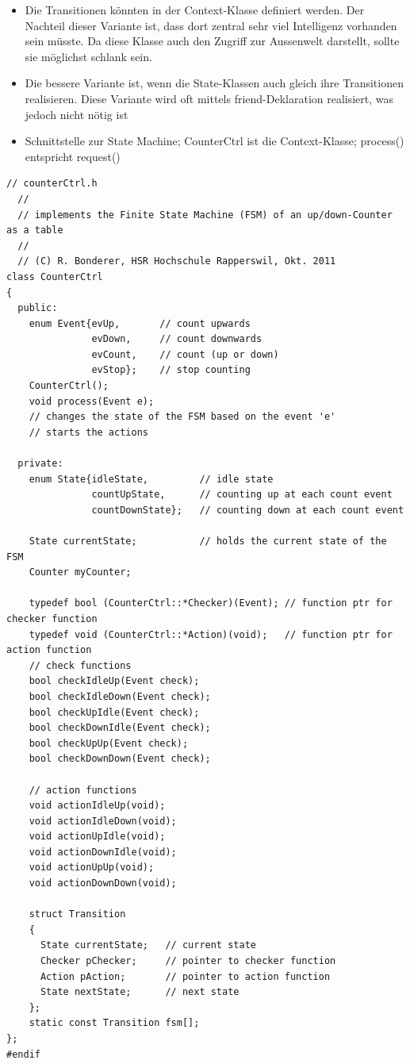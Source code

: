 \begin{itemize}
      \item Die Transitionen könnten in der Context-Klasse definiert werden. Der
            Nachteil dieser Variante ist, dass dort zentral sehr viel Intelligenz vorhanden
            sein müsste. Da diese Klasse auch den Zugriff zur Aussenwelt darstellt, sollte
            sie möglichst schlank sein.
      \item Die bessere Variante ist, wenn die State-Klassen auch gleich ihre
            Transitionen realisieren. Diese Variante wird oft mittels friend-Deklaration
            realisiert, was jedoch nicht nötig ist
      \item Schnittstelle zur State Machine; CounterCtrl ist die Context-Klasse; process() entspricht request()
\end{itemize}
\begin{lstlisting}[style=Cpp]
  // counterCtrl.h
  //
  // implements the Finite State Machine (FSM) of an up/down-Counter as a table
  //
  // (C) R. Bonderer, HSR Hochschule Rapperswil, Okt. 2011
class CounterCtrl
{
  public:
    enum Event{evUp,       // count upwards
               evDown,     // count downwards
               evCount,    // count (up or down)
               evStop};    // stop counting
    CounterCtrl();
    void process(Event e);
    // changes the state of the FSM based on the event 'e'
    // starts the actions

  private:
    enum State{idleState,         // idle state
               countUpState,      // counting up at each count event
               countDownState};   // counting down at each count event

    State currentState;           // holds the current state of the FSM
    Counter myCounter;
    
    typedef bool (CounterCtrl::*Checker)(Event); // function ptr for checker function
    typedef void (CounterCtrl::*Action)(void);   // function ptr for action function
    // check functions
    bool checkIdleUp(Event check);
    bool checkIdleDown(Event check);
    bool checkUpIdle(Event check);
    bool checkDownIdle(Event check);
    bool checkUpUp(Event check);
    bool checkDownDown(Event check);
    
    // action functions
    void actionIdleUp(void);
    void actionIdleDown(void);
    void actionUpIdle(void);
    void actionDownIdle(void);
    void actionUpUp(void);
    void actionDownDown(void);
    
    struct Transition
    {
      State currentState;   // current state
      Checker pChecker;     // pointer to checker function
      Action pAction;       // pointer to action function
      State nextState;      // next state
    };
    static const Transition fsm[];
};
#endif
\end{lstlisting}

